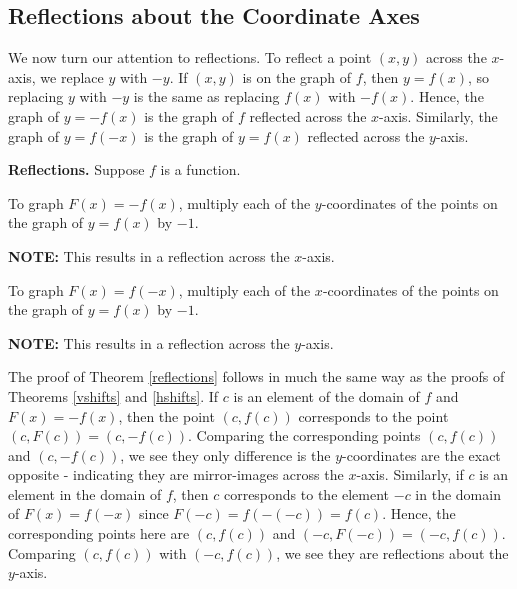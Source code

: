 \subsection{Reflections about the Coordinate Axes}

We now turn our attention to reflections.  To reflect a point $(x,y)$ across the $x$-axis, we replace $y$ with $-y$.  If $(x,y)$ is on the graph of $f$, then $y=f(x)$, so replacing $y$ with $-y$ is the same as replacing $f(x)$ with $-f(x)$.  Hence, the graph of $y=-f(x)$ is the graph of $f$ reflected across the $x$-axis.  Similarly, the graph of $y=f(-x)$ is the graph of $y = f(x)$ reflected across the $y$-axis.

\smallskip

\colorbox{ResultColor}{\bbm


\begin{thm} \label{reflections}\textbf{Reflections.}  Suppose $f$ is a function. 

  To graph $F(x)=-f(x)$,  multiply each of the $y$-coordinates of the points on the graph of $y=f(x)$ by $-1$.

\textbf{NOTE:}  This results in a reflection across the $x$-axis.

To graph $F(x)=f(-x)$,  multiply each of the $x$-coordinates of the points on the graph of $y=f(x)$ by $-1$.

\textbf{NOTE:}  This results in a reflection across the $y$-axis.


\end{thm}

\ebm}

\smallskip

The proof of Theorem \ref{reflections} follows in much the same way as the proofs of Theorems \ref{vshifts} and \ref{hshifts}.  If $c$ is an element of the domain of $f$ and $F(x) = -f(x)$,  then the point $(c, f(c))$ corresponds to the point $(c, F(c)) = (c,-f(c))$.  Comparing the corresponding points $(c, f(c))$ and $(c, -f(c))$, we see they only difference is the $y$-coordinates are the exact opposite - indicating they are mirror-images across the $x$-axis.  Similarly, if $c$ is an element in the domain of $f$, then $c$ corresponds to the element $-c$ in the domain of $F(x) = f(-x)$ since $F(-c) = f(-(-c)) = f(c)$. Hence, the corresponding points here are $(c, f(c))$ and $(-c, F(-c)) = (-c, f(c))$.  Comparing $(c, f(c))$ with $(-c, f(c))$, we see they are reflections about the $y$-axis.

